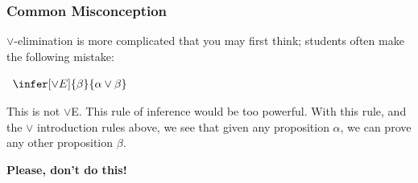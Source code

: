 \documentclass{beamer}
\begin{document}
\begin{frame}
	\frametitle{Common Misconception}
	
	$\lor$-elimination is more complicated that you may first think; students often make the following mistake: 
	
	\begin{center}
		$\begin{array}{c}
			\infer[\lor E]{\beta}
				{\alpha \lor \beta}
		\end{array}$	
	\end{center}
	
	This is not $\lor$E. This rule of inference would be too powerful. With this rule, and the $\lor$ introduction rules above, we see that given any proposition $\alpha$, we can prove any other proposition $\beta$.
	
	\vspace{35mm}
	
	\textbf{Please, don't do this!}
	


\end{frame}
\end{document}

